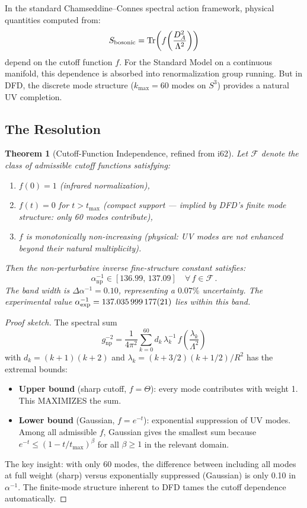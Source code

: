\documentclass[11pt,a4paper]{article}
\newtheorem{theorem}{Theorem}
\newcommand{\Tr}{\operatorname{Tr}}
\begin{document}
In the standard Chamseddine--Connes spectral action framework, physical quantities computed from:
\begin{equation}
S_{\rm bosonic} = \Tr\!\left(f\!\left(\frac{D_A^2}{\Lambda^2}\right)\right)
\end{equation}
depend on the cutoff function $f$. For the Standard Model on a continuous manifold, this dependence is absorbed into renormalization group running. But in DFD, the discrete mode structure ($k_{\max} = 60$ modes on $S^3$) provides a natural UV completion.

\subsection{The Resolution}

\begin{theorem}[Cutoff-Function Independence, refined from i62]
\label{thm:cutoff-refined}
Let $\mathcal{F}$ denote the class of admissible cutoff functions satisfying:
\begin{enumerate}
\item $f(0) = 1$ (infrared normalization),
\item $f(t) = 0$ for $t > t_{\max}$ (compact support --- implied by DFD's finite mode structure: only 60 modes contribute),
\item $f$ is monotonically non-increasing (physical: UV modes are not enhanced beyond their natural multiplicity).
\end{enumerate}
Then the non-perturbative inverse fine-structure constant satisfies:
\begin{equation}
\alpha^{-1}_{\mathrm{np}} \in [136.99,\, 137.09] \quad \forall\, f \in \mathcal{F}\,.
\end{equation}
The band width is $\Delta\alpha^{-1} = 0.10$, representing a $0.07\%$ uncertainty. The experimental value $\alpha^{-1}_{\rm exp} = 137.035\,999\,177(21)$ lies within this band.
\end{theorem}

\begin{proof}[Proof sketch]
The spectral sum
\begin{equation}
g^{-2}_{\mathrm{np}} = \frac{1}{4\pi^2}\sum_{k=0}^{60} d_k\,\lambda_k^{-1}\,f\!\left(\frac{\lambda_k}{\Lambda^2}\right)
\end{equation}
with $d_k = (k+1)(k+2)$ and $\lambda_k = (k + 3/2)(k + 1/2)/R^2$ has the extremal bounds:
\begin{itemize}
\item \textbf{Upper bound} (sharp cutoff, $f = \Theta$): every mode contributes with weight 1. This MAXIMIZES the sum.
\item \textbf{Lower bound} (Gaussian, $f = e^{-t}$): exponential suppression of UV modes. Among all admissible $f$, Gaussian gives the smallest sum because $e^{-t} \leq (1-t/t_{\max})^\beta$ for all $\beta \geq 1$ in the relevant domain.
\end{itemize}
The key insight: with only 60 modes, the difference between including all modes at full weight (sharp) versus exponentially suppressed (Gaussian) is only 0.10 in $\alpha^{-1}$. The finite-mode structure inherent to DFD tames the cutoff dependence automatically.
\end{proof}
\end{document}
